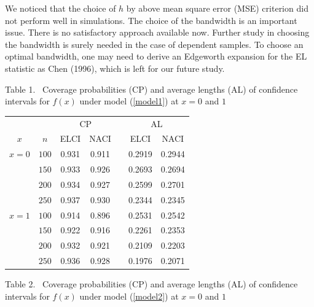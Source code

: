 \documentclass[12pt]{article}
\begin{document}
We noticed that the choice of $h$ by above
 mean square error (MSE) criterion did not perform well in simulations.
The choice of the bandwidth is an important issue. There is no satisfactory approach available now. Further study in choosing the bandwidth is surely needed in the case of dependent samples. To choose an optimal bandwidth, one may need to derive an Edgeworth expansion for the EL statistic as Chen (1996), which is left for our future study.





\bigskip

\noindent

\begin{center}

 Table 1. \ Coverage probabilities (CP) and average lengths (AL) of confidence intervals for  $f(x)$ under model (\ref{model1}) at $x=0$ and $1$
\end{center}


\begin{center}
\begin{tabular}{ccccccc}
\hline  &   & \multicolumn{2}{c}{CP}
     &&\multicolumn{2}{c}{AL}\\
\cline{3-4} \cline{6-7}
$x$ & $n$ &  ELCI   & NACI   && ELCI  & NACI  \\
\cline{3-4} \cline{6-7}
 $x=0$ & $100$  & 0.931  & 0.911 & &  0.2919& 0.2944 \\
          & $150$  &  0.933 & 0.926 & & 0.2693 & 0.2694 \\
          & $200$  &  0.934  & 0.927& & 0.2599 & 0.2701 \\
          & $250$  &  0.937 & 0.930  & & 0.2344& 0.2345\\
$x=1$ & $100$  & 0.914  & 0.896 & &  0.2531& 0.2542\\
          & $150$  &  0.922 & 0.916 & & 0.2261 & 0.2353 \\
          & $200$  &  0.932  & 0.921 & & 0.2109& 0.2203 \\
          & $250$  &  0.936 & 0.928  & & 0.1976& 0.2071\\
 \hline
\end{tabular}
\end{center}


\bigskip

\noindent

\begin{center}

 Table 2. \ Coverage probabilities (CP) and average lengths (AL) of confidence intervals for  $f(x)$ under model (\ref{model2}) at $x=0$ and $1$
\end{center}
\end{document}
